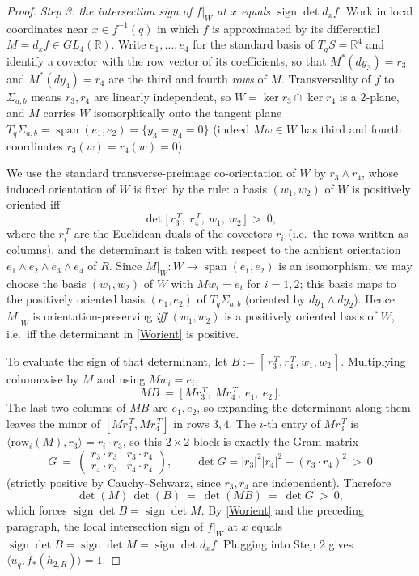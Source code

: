 \documentclass{amsart}
\newtheorem*{theorem 1}{Theorem 1}
\newtheorem*{theorem 2}{Theorem 2}
\newtheorem*{theorem 3}{Theorem 3}
\numberwithin{equation}{section}
\newcommand{\RR}{\mathbb{R}}
\begin{document}
\begin{proof}
\medskip
\noindent\emph{Step 3: the intersection sign of $f|_W$ at $x$ equals $\operatorname{sign}\det d_xf$.}
Work in local coordinates near $x\in f^{-1}(q)$ in which $f$ is
approximated by its differential $M=d_xf\in GL_4(\RR)$.  Write $e_1,
\dots,e_4$ for the standard basis of $T_qS=\RR^4$ and identify a
covector with the row vector of its coefficients, so that
$M^\ast(dy_3)=r_3$ and $M^\ast(dy_4)=r_4$ are the third and fourth
\emph{rows} of $M$.  Transversality of $f$ to $\Sigma_{a,b}$ means
$r_3,r_4$ are linearly independent, so $W=\ker r_3\cap\ker r_4$ is a
$2$-plane, and $M$ carries $W$ isomorphically onto the tangent plane
$T_q\Sigma_{a,b}=\operatorname{span}(e_1,e_2)=\{y_3=y_4=0\}$ (indeed
$M w\in W$ has third and fourth coordinates $r_3(w)=r_4(w)=0$).

We use the standard transverse-preimage co-orientation of $W$ by
$r_3\wedge r_4$, whose induced orientation of $W$ is fixed by the
rule: a basis $(w_1,w_2)$ of $W$ is positively oriented iff
\begin{equation}\label{Worient}
 \det\big[\,r_3^{\,T},\ r_4^{\,T},\ w_1,\ w_2\,\big]\ >\ 0,
\end{equation}
where the $r_i^{\,T}$ are the Euclidean duals of the covectors
$r_i$ (i.e.\ the rows written as columns), and the determinant is
taken with respect to the ambient orientation $e_1\wedge e_2\wedge
e_3\wedge e_4$ of $R$.  Since $M|_W:W\to\operatorname{span}(e_1,e_2)$
is an isomorphism, we may choose the basis $(w_1,w_2)$ of $W$ with
$M w_i=e_i$ for $i=1,2$; this basis maps to the positively oriented
basis $(e_1,e_2)$ of $T_q\Sigma_{a,b}$ (oriented by $dy_1\wedge
dy_2$).  Hence $M|_W$ is orientation-preserving \emph{iff}
$(w_1,w_2)$ is a positively oriented basis of $W$, i.e.\ iff the
determinant in \eqref{Worient} is positive.

To evaluate the sign of that determinant, let
$B:=[\,r_3^{\,T},r_4^{\,T},w_1,w_2\,]$.  Multiplying columnwise by
$M$ and using $Mw_i=e_i$,
$$ MB \ =\ \big[\,Mr_3^{\,T},\ Mr_4^{\,T},\ e_1,\ e_2\,\big]. $$
The last two columns of $MB$ are $e_1,e_2$, so expanding the
determinant along them leaves the minor of
$[Mr_3^{\,T},Mr_4^{\,T}]$ in rows $3,4$.  The $i$-th entry of
$Mr_3^{\,T}$ is $\langle\text{row}_i(M),r_3\rangle=r_i\cdot r_3$, so
this $2\times2$ block is exactly the Gram matrix
$$ G \ =\ \begin{pmatrix} r_3\cdot r_3 & r_3\cdot r_4\\
   r_4\cdot r_3 & r_4\cdot r_4\end{pmatrix}, \qquad
   \det G = |r_3|^2|r_4|^2-(r_3\cdot r_4)^2\ >\ 0 $$
(strictly positive by Cauchy--Schwarz, since $r_3,r_4$ are
independent).  Therefore
$$ \det(M)\,\det(B)\ =\ \det(MB)\ =\ \det G\ >\ 0, $$
which forces $\operatorname{sign}\det B=\operatorname{sign}\det M$.
By \eqref{Worient} and the preceding paragraph, the local
intersection sign of $f|_W$ at $x$ equals
$\operatorname{sign}\det B=\operatorname{sign}\det M=
\operatorname{sign}\det d_xf$.  Plugging into Step 2 gives
$\langle u_q, f_*(h_{2,R})\rangle = 1$.


\end{proof}
\end{document}

